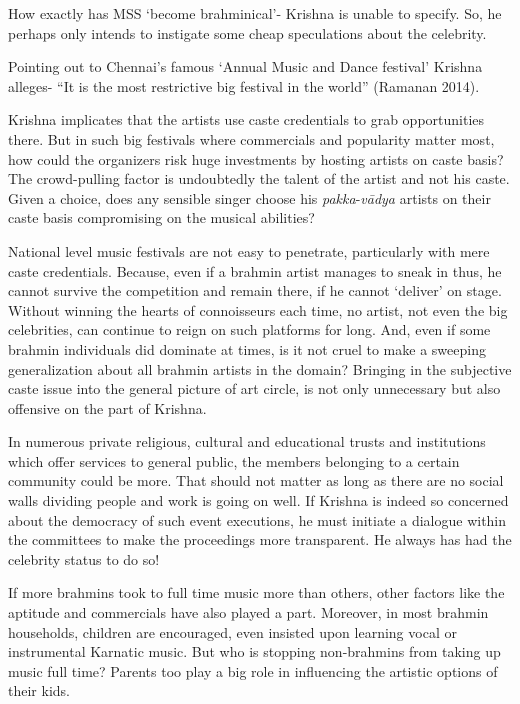How exactly has MSS ‘become brahminical’- Krishna is unable to specify. So, he perhaps only intends to instigate some cheap speculations about the celebrity.

Pointing out to Chennai’s famous ‘Annual Music and Dance festival’ Krishna alleges- “It is the most restrictive big festival in the world” (Ramanan 2014).

Krishna implicates that the artists use caste credentials to grab opportunities there. But in such big festivals where commercials and popularity matter most, how could the organizers risk huge investments by hosting artists on caste basis? The crowd-pulling factor is undoubtedly the talent of the artist and not his caste. Given a choice, does any sensible singer choose his \textit{pakka}-\textit{vādya} artists on their caste basis compromising on the musical abilities?

National level music festivals are not easy to penetrate, particularly with mere caste credentials. Because, even if a brahmin artist manages to sneak in thus, he cannot survive the competition and remain there, if he cannot ‘deliver’ on stage. Without winning the hearts of connoisseurs each time, no artist, not even the big celebrities, can continue to reign on such platforms for long. And, even if some brahmin individuals did dominate at times, is it not cruel to make a sweeping generalization about all brahmin artists in the domain? Bringing in the subjective caste issue into the general picture of art circle, is not only unnecessary but also offensive on the part of Krishna.

In numerous private religious, cultural and educational trusts and institutions which offer services to general public, the members belonging to a certain community could be more. That should not matter as long as there are no social walls dividing people and work is going on well. If Krishna is indeed so concerned about the democracy of such event executions, he must initiate a dialogue within the committees to make the proceedings more transparent. He always has had the celebrity status to do so!

If more brahmins took to full time music more than others, other factors like the aptitude and commercials have also played a part. Moreover, in most brahmin households, children are encouraged, even insisted upon learning vocal or instrumental Karnatic music. But who is stopping non-brahmins from taking up music full time? Parents too play a big role in influencing the artistic options of their kids.

